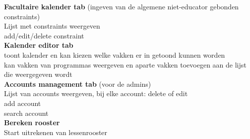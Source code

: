 \documentclass{article}
\begin{document}
\textbf{Facultaire kalender tab} (ingeven van de algemene niet-educator gebonden constraints) \\
Lijst met constraints weergeven \\
add/edit/delete constraint \\

\textbf{Kalender editor tab } \\
toont kalender en kan kiezen welke vakken er in getoond kunnen worden \\
kan vakken van programmas weergeven en aparte vakken toevoegen aan de lijst die weergegeven wordt \\

\textbf{Accounts management tab} (voor de admins) \\
Lijst van accounts weergeven, bij elke account: delete of edit \\
add account \\
search account \\

\textbf{Bereken rooster} \\
Start uitrekenen van lessenrooster \\





 
\end{document}
